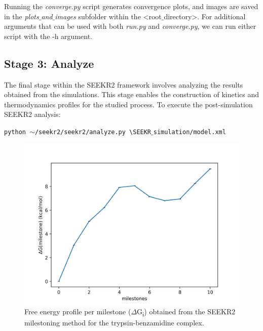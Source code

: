\documentclass[9pt,training,pubversion]{livecoms}
\begin{document}
\noindent Running the \textit{converge.py} script generates convergence plots, and images are saved in the \textit{plots$\_$and$\_$images} subfolder within the <root$\_$directory>. For additional arguments that can be used with both \textit{run.py} and \textit{converge.py}, we can run either script with the -h argument. 

\subsection*{Stage 3: Analyze}
\vspace{2mm}

\noindent The final stage within the SEEKR2 framework involves analyzing the results obtained from the simulations. This stage enables the construction of kinetics and thermodynamics profiles for the studied process. To execute the post-simulation SEEKR2 analysis:

\begin{tcolorbox}[colback=black!8!white, colframe=black!50!black, fontlower=\tiny, left=2pt, right=2pt, top=2pt, bottom=2pt] 
\texttt{python $\sim$/seekr2/seekr2/analyze.py \textbackslash \linebreak SEEKR$\_$simulation/model.xml}
\end{tcolorbox}

\begin{figure}[H]
\centering
\includegraphics[scale=0.60]{images/figure8.png} 
\caption{Free energy profile per milestone ($\Delta$G\textsubscript{i}) obtained from the SEEKR2 milestoning method for the trypsin-benzamidine complex.}
\label{figure8}
\end{figure} 
\end{document}
